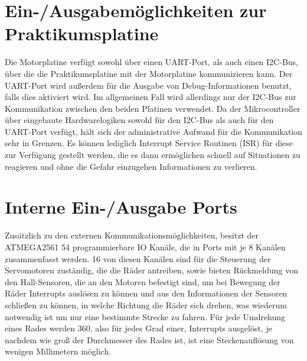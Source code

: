 \section{Ein-/Ausgabemöglichkeiten zur Praktikumsplatine}
Die Motorplatine verfügt sowohl über einen UART-Port, als auch einen I2C-Bus, über die
die Praktikumsplatine mit der Motorplatine kommunizieren kann. Der UART-Port wird außerdem
für die Ausgabe von Debug-Informationen benutzt, falls dies aktiviert wird. Im allgemeinen
Fall wird allerdings nur der I2C-Bus zur Kommunikation zwischen den beiden Platinen verwendet.
Da der Mikrocontroller über eingebaute Hardwarelogiken sowohl für den I2C-Bus als auch für
den UART-Port verfügt, hält sich der administrative Aufwand für die Kommunikation sehr in
Grenzen. Es können lediglich Interrupt Service Routinen (ISR) für diese zur Verfügung gestellt
werden, die es dann ermöglichen schnell auf Situationen zu reagieren und ohne die Gefahr
einzugehen Informationen zu verlieren.
\section{Interne Ein-/Ausgabe Ports}
Zusätzlich zu den externen Kommunikationsmöglichkeiten, besitzt der ATMEGA2561 54
programmierbare IO Kanäle, die in Ports mit je 8 Kanälen zusammenfasst werden. 16 von diesen
Kanälen sind für die Steuerung der Servomotoren zuständig, die die Räder antreiben, sowie bieten
Rückmeldung von den Hall-Sensoren, die an den Motoren befestigt sind, um bei Bewegung der Räder
Interrupts auslösen zu können und aus den Informationen der Sensoren schließen zu können, in welche
Richtung die Räder sich drehen, was wiederum notwendig ist um nur eine bestimmte Strecke zu fahren.
Für jede Umdrehung eines Rades werden 360, also für jedes Grad einer, Interrupts ausgelöst, je
nachdem wie groß der Durchmesser des Rades ist, ist eine Steckenauflösung  von wenigen Millimetern
möglich.

